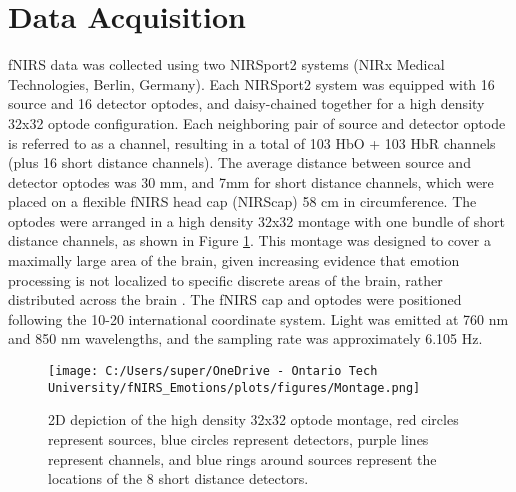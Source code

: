 \section{Data Acquisition}
fNIRS data was collected using two NIRSport2 systems (NIRx Medical Technologies, Berlin, Germany). 
Each NIRSport2 system was equipped with 16 source and 16 detector optodes, and daisy-chained together for a high density 32x32 optode configuration. 
Each neighboring pair of source and detector optode is referred to as a channel, resulting in a total of 103 HbO + 103 HbR channels (plus 16 short distance channels).
The average distance between source and detector optodes was 30 mm, and 7mm for short distance channels, which were placed on a flexible fNIRS head cap (NIRScap) 58 cm in circumference. 
The optodes were arranged in a high density 32x32 montage with one bundle of short distance channels, as shown in Figure \ref{fig:montage}. 
This montage was designed to cover a maximally large area of the brain, given increasing evidence that emotion processing is not localized to specific discrete areas of the brain, rather distributed across the brain \citep{lindquist_brain_2012}. 
The fNIRS cap and optodes were positioned following the 10-20 international coordinate system.
Light was emitted at 760 nm and 850 nm wavelengths, and the sampling rate was approximately 6.105 Hz.

\begin{figure}[H]
    \centering
    \texttt{[image: C:/Users/super/OneDrive - Ontario Tech University/fNIRS\_Emotions/plots/figures/Montage.png]}
    \caption{2D depiction of the high density 32x32 optode montage, red circles represent sources, blue circles
    represent detectors, purple lines represent channels, and blue rings around sources represent the locations of the 8 short distance detectors. }
    \label{fig:montage}
\end{figure}

